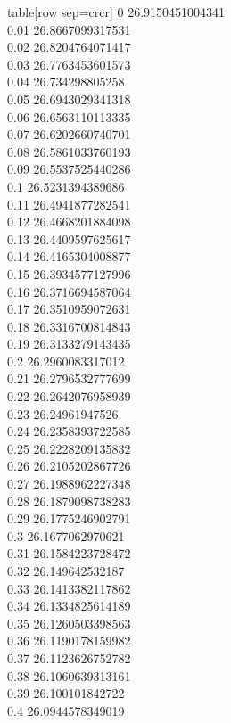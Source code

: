   table[row sep=crcr]{%
0	26.9150451004341\\
0.01	26.8667099317531\\
0.02	26.8204764071417\\
0.03	26.7763453601573\\
0.04	26.734298805258\\
0.05	26.6943029341318\\
0.06	26.6563110113335\\
0.07	26.6202660740701\\
0.08	26.5861033760193\\
0.09	26.5537525440286\\
0.1	26.5231394389686\\
0.11	26.4941877282541\\
0.12	26.4668201884098\\
0.13	26.4409597625617\\
0.14	26.4165304008877\\
0.15	26.3934577127996\\
0.16	26.3716694587064\\
0.17	26.3510959072631\\
0.18	26.3316700814843\\
0.19	26.3133279143435\\
0.2	26.2960083317012\\
0.21	26.2796532777699\\
0.22	26.2642076958939\\
0.23	26.24961947526\\
0.24	26.2358393722585\\
0.25	26.2228209135832\\
0.26	26.2105202867726\\
0.27	26.1988962227348\\
0.28	26.1879098738283\\
0.29	26.1775246902791\\
0.3	26.1677062970621\\
0.31	26.1584223728472\\
0.32	26.149642532187\\
0.33	26.1413382117862\\
0.34	26.1334825614189\\
0.35	26.1260503398563\\
0.36	26.1190178159982\\
0.37	26.1123626752782\\
0.38	26.1060639313161\\
0.39	26.100101842722\\
0.4	26.0944578349019\\
}
